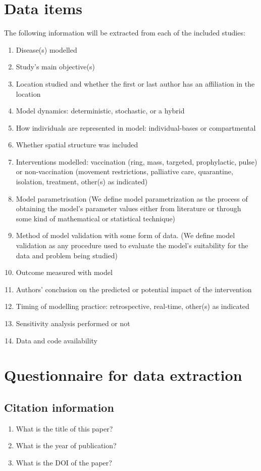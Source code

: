 \documentclass[10pt,a4paper]{article}
\begin{document}
\section{Data items}
The following information will be extracted from each of the included studies:
\begin{enumerate}
		\item Disease(s) modelled
		\item Study's main objective(s)
		\item Location studied and whether the first or last author has an affiliation in the location
		\item Model dynamics: deterministic, stochastic, or a hybrid
		\item How individuals are represented in model: individual-bases or compartmental
		\item Whether spatial structure was included
		\item Interventions modelled: vaccination (ring, mass, targeted, prophylactic, pulse) or non-vaccination (movement restrictions, palliative care, quarantine, isolation, treatment, other(s) as indicated)
		\item Model parametrisation (We define model parametrization as the process of obtaining the model's parameter values either from literature or through some kind of mathematical or statistical technique)
		\item Method of model validation with some form of data. (We define model validation as any procedure used to evaluate the model’s suitability for the data and problem being studied)
		\item Outcome measured with model
		\item Authors’ conclusion on the predicted or potential impact of the intervention
		\item Timing of modelling practice: retrospective, real-time, other(s) as indicated
		\item Sensitivity analysis performed or not
		\item Data and code availability
	\end{enumerate}


\section{Questionnaire for data extraction}
	\subsection{Citation information}
	\begin{enumerate}
		\item What is the title of this paper?
		\item What is the year of publication? 
		\item What is the DOI of the paper? 
	\end{enumerate}
	
\end{document}
